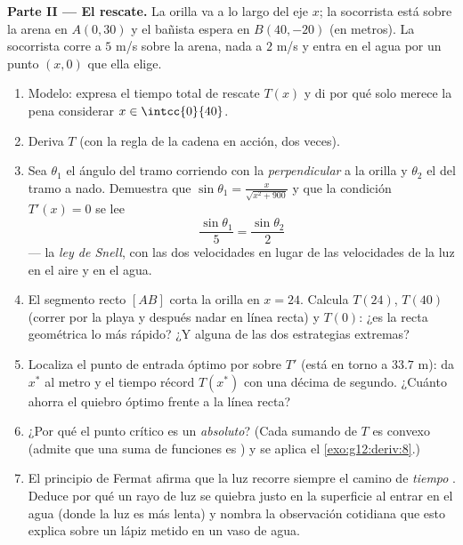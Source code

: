 \begin{problem}
\medskip
\noindent\textbf{Parte II --- El rescate.}
La orilla va a lo largo del eje $x$; la socorrista está sobre la arena en
$A(0, 30)$ y el bañista espera en $B(40, -20)$ (en metros). La socorrista
corre a $5$ m/s sobre la arena, nada a $2$ m/s y entra en el agua por un
punto $(x, 0)$ que ella elige.
\begin{enumerate}[resume]
  \item Modelo: expresa el tiempo total de rescate $T(x)$ y di por qué solo
        merece la pena considerar $x \in \intcc{0}{40}$.
  \item Deriva $T$ (con la regla de la cadena en acción, dos veces).
  \item Sea $\theta_1$ el ángulo del tramo corriendo con la
        \emph{perpendicular} a la orilla y $\theta_2$ el del tramo a nado.
        Demuestra que $\sin\theta_1 = \frac{x}{\sqrt{x^2 + 900}}$ y que la
        condición $T'(x) = 0$ se lee
        \[
        \frac{\sin\theta_1}{5} = \frac{\sin\theta_2}{2}
        \]
        --- la \emph{ley de Snell}, con las dos velocidades en lugar de las
        velocidades de la luz en el aire y en el agua.
  \item El segmento recto $[AB]$ corta la orilla en $x = 24$. Calcula
        $T(24)$, $T(40)$ (correr por la playa y después nadar en línea
        recta) y $T(0)$: ¿es la recta geométrica lo más rápido? ¿Y alguna
        de las dos estrategias extremas?
  \item Localiza el punto de entrada óptimo por  sobre $T'$ (está
        en torno a $33.7$ m): da $x^*$ al metro y el tiempo récord
        $T(x^*)$ con una décima de segundo. ¿Cuánto ahorra el quiebro
        óptimo frente a la línea recta?
  \item ¿Por qué el punto crítico es un  \emph{absoluto}? (Cada
        sumando de $T$ es convexo (admite que una suma de funciones
         es ) y se aplica el \cref{exo:g12:deriv:8}.)
  \item El principio de Fermat afirma que la luz recorre siempre el camino
        de \emph{tiempo} . Deduce por qué un rayo de luz se quiebra
        justo en la superficie al entrar en el agua (donde la luz es más
        lenta) y nombra la observación cotidiana que esto explica sobre un
        lápiz metido en un vaso de agua.
\end{enumerate}


\end{problem}
